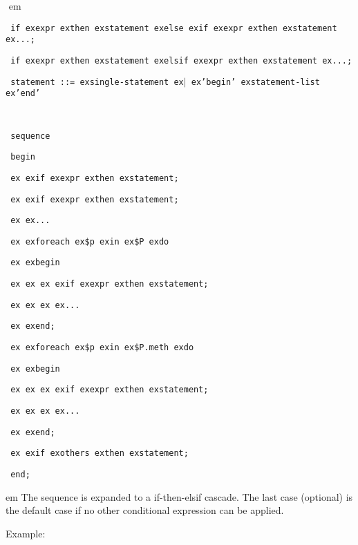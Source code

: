 \documentclass[a4paper,12pt,twoside,english]{article}
\def\s{\hskip 1.15 ex}
\begin{document}
\begin{description}
\begin{description}
\def\prefskipu{}\def\prefskipo{}\def\prefskipa{}\def\prefskipu{\hskip10pt}\def\prefskipo{\hskip10pt}\def\prefskipa{\hskip30pt}\def\content{
\vskip-5pt{\parindent0pt\parbox{\linewidth}{\tt\smallsize\hskip10pt if\s expr\s then\s statement\s else\s if\s expr\s then\s statement\s ...;}}
\vskip-5pt{\parindent0pt\parbox{\linewidth}{\tt\smallsize\hskip10pt if\s expr\s then\s statement\s elsif\s expr\s then\s statement\s ...;}}
\vskip-5pt{\parindent0pt\parbox{\linewidth}{\tt\smallsize\hskip10pt statement~::=\s single-statement\s $|$\s 'begin'\s statement-list\s 'end'}}
\vskip-5pt{\parindent0pt\parbox{\linewidth}{\tt\smallsize\hskip10pt }}
\vskip-5pt{\parindent0pt\parbox{\linewidth}{\tt\smallsize\hskip10pt sequence}}
\vskip-5pt{\parindent0pt\parbox{\linewidth}{\tt\smallsize\hskip10pt begin}}
\vskip-5pt{\parindent0pt\parbox{\linewidth}{\tt\smallsize\hskip10pt \s \s if\s expr\s then\s statement;}}
\vskip-5pt{\parindent0pt\parbox{\linewidth}{\tt\smallsize\hskip10pt \s \s if\s expr\s then\s statement;}}
\vskip-5pt{\parindent0pt\parbox{\linewidth}{\tt\smallsize\hskip10pt \s \s ...}}
\vskip-5pt{\parindent0pt\parbox{\linewidth}{\tt\smallsize\hskip10pt \s \s foreach\s \$p\s in\s \$P\s do}}
\vskip-5pt{\parindent0pt\parbox{\linewidth}{\tt\smallsize\hskip10pt \s \s begin}}
\vskip-5pt{\parindent0pt\parbox{\linewidth}{\tt\smallsize\hskip10pt \s \s \s \s if\s expr\s then\s statement;}}
\vskip-5pt{\parindent0pt\parbox{\linewidth}{\tt\smallsize\hskip10pt \s \s \s \s ...}}
\vskip-5pt{\parindent0pt\parbox{\linewidth}{\tt\smallsize\hskip10pt \s \s end;}}
\vskip-5pt{\parindent0pt\parbox{\linewidth}{\tt\smallsize\hskip10pt \s \s foreach\s \$p\s in\s \$P.meth\s do}}
\vskip-5pt{\parindent0pt\parbox{\linewidth}{\tt\smallsize\hskip10pt \s \s begin}}
\vskip-5pt{\parindent0pt\parbox{\linewidth}{\tt\smallsize\hskip10pt \s \s \s \s if\s expr\s then\s statement;}}
\vskip-5pt{\parindent0pt\parbox{\linewidth}{\tt\smallsize\hskip10pt \s \s \s \s ...}}
\vskip-5pt{\parindent0pt\parbox{\linewidth}{\tt\smallsize\hskip10pt \s \s end;}}
\vskip-5pt{\parindent0pt\parbox{\linewidth}{\tt\smallsize\hskip10pt \s \s if\s others\s then\s statement;}}
\vskip-5pt{\parindent0pt\parbox{\linewidth}{\tt\smallsize\hskip10pt end;}}
}
$ $
 em
\content
{} em
The sequence is expanded to a if-then-elsif cascade.  The last case (optional) is the default case if no other conditional expression can be applied.

Example:


\end{description}
\end{description}
\end{document}

